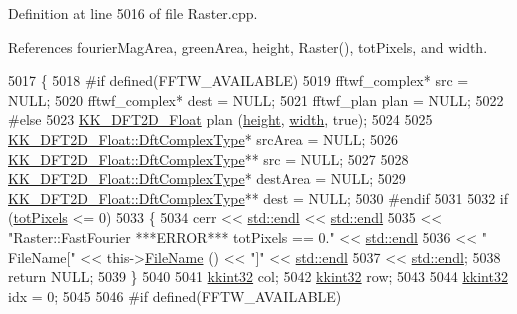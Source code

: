 Definition at line 5016 of file Raster.\+cpp.



References fourier\+Mag\+Area, green\+Area, height, Raster(), tot\+Pixels, and width.


\begin{DoxyCode}
5017 \{
5018 \textcolor{preprocessor}{  #if  defined(FFTW\_AVAILABLE)}
5019     fftwf\_complex*   src  = NULL;
5020     fftwf\_complex*   dest = NULL;
5021     fftwf\_plan       plan = NULL;
5022 \textcolor{preprocessor}{  #else}
5023     \hyperlink{class_k_k_b_1_1_k_k___d_f_t2_d}{KK\_DFT2D\_Float}  plan (\hyperlink{class_k_k_b_1_1_raster_af39ff189de4fbb6de98392e187efafb7}{height}, \hyperlink{class_k_k_b_1_1_raster_ae0bcc103e191c3421d7692dc69ceb554}{width}, \textcolor{keyword}{true});
5024 
5025     \hyperlink{class_k_k_b_1_1_k_k___d_f_t2_d_a3277abaea54d0d88958f030092b9ac38}{KK\_DFT2D\_Float::DftComplexType}*   srcArea = NULL;
5026     \hyperlink{class_k_k_b_1_1_k_k___d_f_t2_d_a3277abaea54d0d88958f030092b9ac38}{KK\_DFT2D\_Float::DftComplexType}**  src     = NULL;
5027 
5028     \hyperlink{class_k_k_b_1_1_k_k___d_f_t2_d_a3277abaea54d0d88958f030092b9ac38}{KK\_DFT2D\_Float::DftComplexType}*   destArea = NULL;
5029     \hyperlink{class_k_k_b_1_1_k_k___d_f_t2_d_a3277abaea54d0d88958f030092b9ac38}{KK\_DFT2D\_Float::DftComplexType}**  dest     = NULL;
5030 \textcolor{preprocessor}{  #endif}
5031 
5032   \textcolor{keywordflow}{if}  (\hyperlink{class_k_k_b_1_1_raster_a9b08c4a0ca0a35435a478599635f1dc0}{totPixels} <= 0)
5033   \{
5034     cerr << \hyperlink{namespace_k_k_b_ad1f50f65af6adc8fa9e6f62d007818a8}{std::endl} << \hyperlink{namespace_k_k_b_ad1f50f65af6adc8fa9e6f62d007818a8}{std::endl}
5035       << \textcolor{stringliteral}{"Raster::FastFourier   ***ERROR***      totPixels == 0."} << \hyperlink{namespace_k_k_b_ad1f50f65af6adc8fa9e6f62d007818a8}{std::endl}
5036       << \textcolor{stringliteral}{"              FileName["} << this->\hyperlink{class_k_k_b_1_1_raster_a847b09bd1487b61bf126d7732f3694f2}{FileName} () << \textcolor{stringliteral}{"]"}    << 
      \hyperlink{namespace_k_k_b_ad1f50f65af6adc8fa9e6f62d007818a8}{std::endl}
5037       << \hyperlink{namespace_k_k_b_ad1f50f65af6adc8fa9e6f62d007818a8}{std::endl};
5038     \textcolor{keywordflow}{return} NULL;
5039   \}
5040 
5041   \hyperlink{namespace_k_k_b_a8fa4952cc84fda1de4bec1fbdd8d5b1b}{kkint32}  col;
5042   \hyperlink{namespace_k_k_b_a8fa4952cc84fda1de4bec1fbdd8d5b1b}{kkint32}  row;
5043 
5044   \hyperlink{namespace_k_k_b_a8fa4952cc84fda1de4bec1fbdd8d5b1b}{kkint32}  idx = 0;
5045 
5046 \textcolor{preprocessor}{  #if  defined(FFTW\_AVAILABLE)}

\end{DoxyCode}

